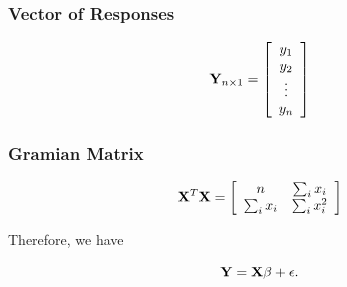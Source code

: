 \subsubsection*{Vector of Responses}

\begin{equation*}
\mathbf{Y}_{n \times 1} =\left[ \begin{array}{c} y_1\\ y_2 \\ \vdots \\ y_n\\ \end{array} \right]
\end{equation*}

\subsubsection*{Gramian Matrix}

\begin{equation*}
\mathbf{X}^T\mathbf{X} =\left[ \begin{array}{cc} n & \sum_i x_i\\ \sum_i x_i  & \sum_i x_i^2\\ \end{array} \right]
\end{equation*}

Therefore, we have

$$
\mathbf{Y} = \mathbf{X\beta} + \mathbf{\epsilon}.
$$

